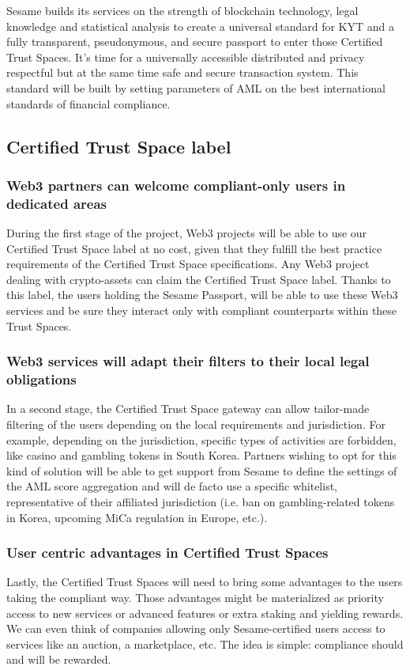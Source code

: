 ﻿\documentclass[a4paper]{article}
\let\OldTexttrademark\texttrademark
\renewcommand{\texttrademark}{\OldTexttrademark\xspace}%
\begin{document}
Sesame builds its services on the strength of blockchain technology, legal knowledge and statistical analysis to create a universal standard for KYT and a fully transparent, pseudonymous, and secure passport to enter those Certified Trust Spaces\OldTexttrademark. It’s time for a universally accessible distributed and privacy respectful but at the same time safe and secure transaction system. This standard will be built by setting parameters of AML on the best international standards of financial compliance. 

\subsection{Certified Trust Space\texttrademark label}
\subsubsection{Web3 partners can welcome compliant-only users in dedicated areas}
During the first stage of the project, Web3 projects will be able to use our Certified Trust Space\texttrademark label at no cost, given that they fulfill the best practice requirements of the Certified Trust Space\texttrademark specifications. Any Web3 project dealing with crypto-assets can claim the Certified Trust Space\texttrademark label. Thanks to this label, the users holding the Sesame Passport, will be able to use these Web3 services and be sure they interact only with compliant counterparts within these Trust Spaces.

\subsubsection{Web3 services will adapt their filters to their local legal obligations}
In a second stage, the Certified Trust Space gateway can allow tailor-made filtering of the users depending on the local requirements and jurisdiction. For example, depending on the jurisdiction, specific types of activities are forbidden, like casino and gambling tokens in South Korea. Partners wishing to opt for this kind of solution will be able to get support from Sesame to define the settings of the AML score aggregation and will de facto use a specific whitelist, representative of their affiliated jurisdiction (i.e. ban on gambling-related tokens in Korea, upcoming MiCa regulation in Europe, etc.).

\subsubsection{User centric advantages in Certified Trust Spaces\texttrademark} 
Lastly, the Certified Trust Spaces\texttrademark will need to bring some advantages to the users taking the compliant way. Those advantages might be materialized as priority access to new services or advanced features or extra staking and yielding rewards. We can even think of companies allowing only Sesame-certified users access to services like an auction, a marketplace, etc. The idea is simple: compliance should and will be rewarded.
\end{document}
